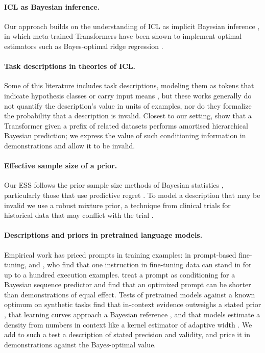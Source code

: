 \documentclass[10pt]{article}
\begin{document}
\paragraph{ICL as Bayesian inference.} Our approach builds on the understanding of ICL as implicit Bayesian inference \citep{xie2022}, in which meta-trained Transformers have been shown to implement optimal estimators such as Bayes-optimal ridge regression \citep{akyurek2023, raventos2023, panwar2024}.

\paragraph{Task descriptions in theories of ICL.} Some of this literature includes task descriptions, modeling them as tokens that indicate hypothesis classes or carry input means \citep{huangge2025, lin2025, tong2026, lin2024}, but these works generally do not quantify the description's value in units of examples, nor do they formalize the probability that a description is invalid. Closest to our setting, \citet{zhu2026} show that a Transformer given a prefix of related datasets performs amortised hierarchical Bayesian prediction; we express the value of such conditioning information in demonstrations and allow it to be invalid.

\paragraph{Effective sample size of a prior.} Our ESS follows the prior sample size methods of Bayesian statistics \citep{morita2008, reimherr2021, neuenschwander2020}, particularly those that use predictive regret \citep{reznik2026}. To model a description that may be invalid we use a robust mixture prior, a technique from clinical trials for historical data that may conflict with the trial \citep{schmidli2014}.

\paragraph{Descriptions and priors in pretrained language models.} Empirical work has priced prompts in training examples: \citet{lescao2021} in prompt-based fine-tuning, and \citet{cook2026}, who find that one instruction in fine-tuning data can stand in for up to a hundred execution examples. \citet{wenliang2025} treat a prompt as conditioning for a Bayesian sequence predictor and find that an optimized prompt can be shorter than demonstrations of equal effect. Tests of pretrained models against a known optimum on synthetic tasks find that in-context evidence outweighs a stated prior \citep{gupta2025}, that learning curves approach a Bayesian reference \citep{akata2026}, and that models estimate a density from numbers in context like a kernel estimator of adaptive width \citep{liu2025}. We add to such a test a description of stated precision and validity, and price it in demonstrations against the Bayes-optimal value.
\end{document}
